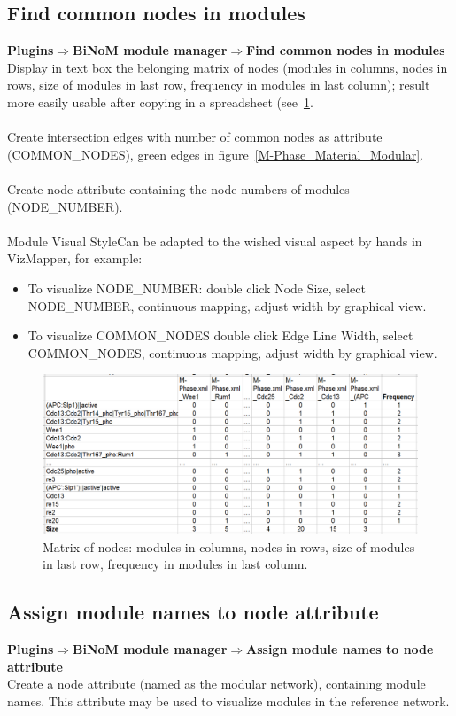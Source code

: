 \subsection{Find common nodes in modules}
\textbf{Plugins$\Rightarrow$BiNoM module manager$\Rightarrow$Find common nodes in modules}\\
Display in text box the belonging matrix of nodes (modules in columns, nodes in rows, size of modules in last row, frequency in modules in last column); result more easily usable after copying in a spreadsheet (see~\ref{Common_nodes_in_modules}.\\\\
Create intersection edges with number of common nodes as attribute (COMMON\_NODES), green edges in figure~\ref{M-Phase_Material_Modular}.\\\\
Create node attribute containing the node numbers of modules (NODE\_NUMBER).\\\\
Module Visual StyleCan be adapted to the wished visual aspect by hands in VizMapper, for example:
\begin{itemize}
\item To visualize NODE\_NUMBER: double click Node Size, select NODE\_NUMBER, continuous mapping, adjust width by graphical view.
\item To visualize COMMON\_NODES double click Edge Line Width, select COMMON\_NODES, continuous mapping, adjust width by graphical view.
\end{itemize}
\begin{figure}
\centering
\includegraphics[width=18 cm]{graphics/Common_nodes_in_modules}
\caption{Matrix of nodes: modules in columns, nodes in rows, size of modules in last row, frequency in modules in last column.}
\label{Common_nodes_in_modules}
\end{figure}

\subsection{Assign module names to node attribute}
\textbf{Plugins$\Rightarrow$BiNoM module manager$\Rightarrow$Assign module names to node attribute}\\
Create a node attribute (named as the modular network), containing module names. This attribute may be used to visualize modules in the reference network.

